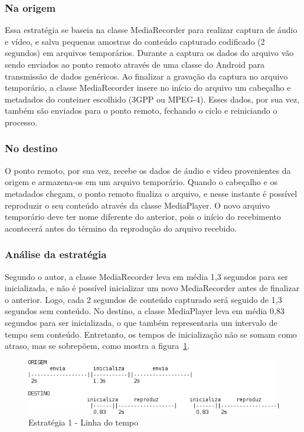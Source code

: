\documentclass{acm_proc_article-sp}
\begin{document}
\subsubsection{Na origem}

Essa estratégia se baseia na classe MediaRecorder para realizar captura de áudio e vídeo, e salva pequenas amostras do conteúdo capturado codificado (2 segundos) em arquivos temporários. Durante a captura os dados do arquivo vão sendo enviados ao ponto remoto através de uma classe do Android para transmissão de dados genéricos. Ao finalizar a gravação da captura no arquivo temporário, a classe MediaRecorder insere no início do arquivo um cabeçalho e metadados do conteiner escolhido (3GPP ou MPEG-4). Esses dados, por sua vez, também são enviados para o ponto remoto, fechando o ciclo e reiniciando o processo.

\subsubsection{No destino}

O ponto remoto, por sua vez, recebe os dados de áudio e vídeo provenientes da origem e armazena-os em um arquivo temporário. Quando o cabeçalho e os metadados chegam, o ponto remoto finaliza o arquivo, e nesse instante é possível reproduzir o seu conteúdo através da classe MediaPlayer. O novo arquivo temporário deve ter nome diferente do anterior, pois o início do recebimento acontecerá antes do término da reprodução do arquivo recebido.

\subsubsection{Análise da estratégia}

Segundo o autor, a classe MediaRecorder leva em média 1,3 segundos para ser inicializada, e não é possível inicializar um novo MediaRecorder antes de finalizar o anterior. Logo, cada 2 segundos de conteúdo capturado será seguido de 1,3 segundos sem conteúdo. No destino, a classe MediaPlayer leva em média 0,83 segundos para ser inicializada, o que também representaria um intervalo de tempo sem conteúdo. Entretanto, os tempos de inicialização não se somam como atraso, mas se sobrepõem, como mostra a figura~\ref{figura_estrategia1}.

\begin{figure}[htp]
 \centering
 \includegraphics[scale=0.7]{./estrategia1.png}
\caption{Estratégia 1 - Linha do tempo}\label{figura_estrategia1}
\end{figure}
\end{document}
